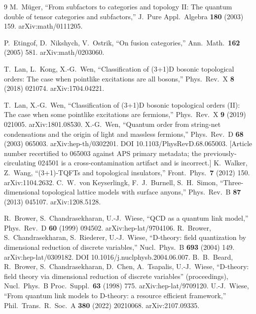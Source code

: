 \documentclass[12pt,a4paper,twoside]{article}
\theoremstyle{plain}
\theoremstyle{definition}
\theoremstyle{remark}
\begin{document}
\begin{thebibliography}{9}
M.~M\"uger, ``From subfactors to categories and topology II: The quantum double of tensor categories and subfactors,'' J.\ Pure Appl.\ Algebra \textbf{180} (2003) 159. arXiv:math/0111205.

P.~Etingof, D.~Nikshych, V.~Ostrik, ``On fusion categories,'' Ann.\ Math.\ \textbf{162} (2005) 581. arXiv:math/0203060.

T.~Lan, L.~Kong, X.-G.~Wen, ``Classification of (3+1)D bosonic topological orders: The case when pointlike excitations are all bosons,'' Phys.\ Rev.\ X \textbf{8} (2018) 021074. arXiv:1704.04221.

T.~Lan, X.-G.~Wen, ``Classification of (3+1)D bosonic topological orders (II): The case when some pointlike excitations are fermions,'' Phys.\ Rev.\ X \textbf{9} (2019) 021005. arXiv:1801.08530.
X.-G.~Wen, ``Quantum order from string-net condensations and the origin of light and massless fermions,'' Phys.\ Rev.\ D \textbf{68} (2003) 065003. arXiv:hep-th/0302201. DOI 10.1103/PhysRevD.68.065003. [Article number recertified to 065003 against APS primary metadata; the previously-circulating 024501 is a cross-contamination artifact and is incorrect.]
K.~Walker, Z.~Wang, ``(3+1)-TQFTs and topological insulators,'' Front.\ Phys.\ \textbf{7} (2012) 150. arXiv:1104.2632.
C.~W.~von Keyserlingk, F.~J.~Burnell, S.~H.~Simon, ``Three-dimensional topological lattice models with surface anyons,'' Phys.\ Rev.\ B \textbf{87} (2013) 045107. arXiv:1208.5128.

R.~Brower, S.~Chandrasekharan, U.-J.~Wiese, ``QCD as a quantum link model,'' Phys.\ Rev.\ D \textbf{60} (1999) 094502. arXiv:hep-lat/9704106.
R.~Brower, S.~Chandrasekharan, S.~Riederer, U.-J.~Wiese, ``D-theory: field quantization by dimensional reduction of discrete variables,'' Nucl.\ Phys.\ B \textbf{693} (2004) 149. arXiv:hep-lat/0309182. DOI 10.1016/j.nuclphysb.2004.06.007.
B.~B.~Beard, R.~Brower, S.~Chandrasekharan, D.~Chen, A.~Tsapalis, U.-J.~Wiese, ``D-theory: field theory via dimensional reduction of discrete variables'' (proceedings), Nucl.\ Phys.\ B Proc.\ Suppl.\ \textbf{63} (1998) 775. arXiv:hep-lat/9709120.
U.-J.~Wiese, ``From quantum link models to D-theory: a resource efficient framework,'' Phil.\ Trans.\ R.\ Soc.\ A \textbf{380} (2022) 20210068. arXiv:2107.09335.


\end{thebibliography}
\end{document}
